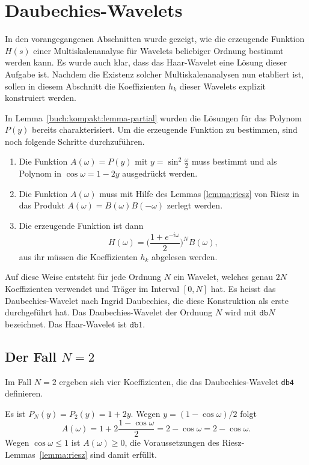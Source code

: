 %
%
%
\section{Daubechies-Wavelets\label{section:daubechies}}
In den vorangegangenen Abschnitten wurde gezeigt, wie die erzeugende
Funktion $H(s)$ einer Multi\-skalenanalyse für Wavelets beliebiger
Ordnung bestimmt werden kann.
Es wurde auch klar, dass das Haar-Wavelet eine Lösung dieser Aufgabe
ist.
Nachdem die Existenz solcher Multiskalenana\-ly\-sen nun etabliert ist,
sollen in diesem Abschnitt die Koeffizienten $h_k$ dieser Wavelets
explizit konstruiert werden.

In Lemma~\ref{buch:kompakt:lemma-partial} wurden die Lösungen für das
Polynom $P(y)$ bereits charakterisiert.
Um die erzeugende Funktion zu bestimmen, sind noch folgende Schritte
durchzuführen.
\begin{enumerate}
\item
Die Funktion $A(\omega)=P(y)$ mit $y=\sin^2\frac{\omega}2$ muss
bestimmt und als Polynom in $\cos\omega=1-2y$ ausgedrückt werden.
\item
Die Funktion $A(\omega)$ muss mit Hilfe des Lemmas \ref{lemma:riesz}
von Riesz in das Produkt $A(\omega)=B(\omega)B(-\omega)$ zerlegt
werden.
\item
Die erzeugende Funktion ist dann
\[
H(\omega)
=
\biggl(
\frac{1+e^{-i\omega}}2
\biggr)^N
B(\omega),
\]
aus ihr müssen die Koeffizienten $h_k$ abgelesen werden.
\end{enumerate}
Auf diese Weise entsteht für jede Ordnung $N$ ein Wavelet, welches
genau $2N$ Koeffizienten verwendet und Träger im Interval
$[0,N]$ hat.
Es heisst das Daubechies-Wavelet
nach Ingrid Daubechies, die diese Konstruktion als erste durchgeführt hat.
Das Daubechies-Wavelet der Ordnung $N$ wird mit $\texttt{db}N$
bezeichnet.
Das Haar-Wavelet ist $\texttt{db}1$.

\subsection{Der Fall $N=2$}
Im Fall $N=2$ ergeben sich vier Koeffizienten, die das Daubechies-Wavelet
\texttt{db4} definieren.
%

Es ist $P_N(y)=P_2(y)=1+2y$.
Wegen $y=(1-\cos \omega)/2$ folgt
\[
A(\omega) = 1 + 2\frac{1-\cos\omega}2 = 2-\cos\omega
= 2- \cos\omega.
\]
Wegen $\cos\omega\le 1$ ist $A(\omega) \ge 0$, die Voraussetzungen des
Riesz-Lemmas~\ref{lemma:riesz} sind damit erfüllt.

